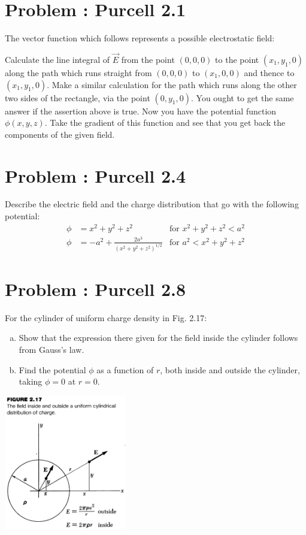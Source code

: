 \documentclass[problems]{esg8022pset}
\begin{document}
\section{Problem \thesection: Purcell 2.1}
  The vector function which follows represents a possible electrostatic field:


  Calculate the line integral of $\vec E$ from the point $(0, 0, 0)$ to the point $(x_1, y_1, 0)$ along the path which runs straight from $(0, 0, 0)$ to $(x_1, 0, 0)$ and thence to $(x_1, y_1, 0)$. Make a similar calculation for the path which runs along the other two sides of the rectangle, via the point $(0, y_1, 0)$. You ought to get the same answer if the assertion above is true. Now you have the potential function $\phi(x, y, z)$. Take the gradient of this function and see that you get back the components of the given field.
\section{Problem \thesection: Purcell 2.4}
  Describe the electric field and the charge distribution that go with the following potential:
  \begin{align*}
    \phi & = x^2 + y^2 + z^2 & \text{for }x^2 + y^2 + z^2 < a^2 \\
    \phi & = -a^2 + \frac{2a^3}{(x^2 + y^2 + z^2)^{1/2}} & \text{for }a^2 < x^2 + y^2 + z^2
  \end{align*}
\section{Problem \thesection: Purcell 2.8}
  For the cylinder of uniform charge density in Fig. 2.17:
  \begin{enumerate}[(a)]
    \item Show that the expression there given for the field inside the cylinder follows from Gauss's law.
    \item Find the potential $\phi$ as a function of $r$, both inside and outside the cylinder, taking $\phi = 0$ at $r = 0$.
  \end{enumerate}
  \begin{center}\includegraphics[width=0.4\textwidth]{ps02_2}\end{center}
\end{document}
